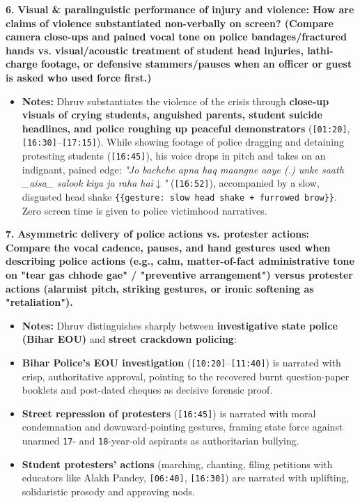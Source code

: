 \documentclass[10pt,a4paper]{article}
\begin{document}
\noindent\textbf{6.} \textbf{Visual \& paralinguistic performance of injury and violence: How are claims of violence substantiated non-verbally on screen? (Compare camera close-ups and pained vocal tone on police bandages/fractured hands vs. visual/acoustic treatment of student head injuries, lathi-charge footage, or defensive stammers/pauses when an officer or guest is asked who used force first.)}\par\smallskip
\begin{itemize}
  \item \textbf{Notes:}
Dhruv substantiates the violence of the crisis through \textbf{close-up visuals of crying students, anguished parents, student suicide headlines, and police roughing up peaceful demonstrators} (\texttt{[01:20]}, \texttt{[16:30]}--\texttt{[17:15]}). While showing footage of police dragging and detaining protesting students (\texttt{[16:45]}), his voice drops in pitch and takes on an indignant, pained edge: \textit{"Jo bachche apna haq maangne aaye (.) unke saath \_aisa\_ salook kiya ja raha hai$\downarrow$"} (\texttt{[16:52]}), accompanied by a slow, disgusted head shake \texttt{\{\{gesture: slow head shake + furrowed brow\}\}}. Zero screen time is given to police victimhood narratives.\par\smallskip
\end{itemize}

\noindent\textbf{7.} \textbf{Asymmetric delivery of police actions vs. protester actions: Compare the vocal cadence, pauses, and hand gestures used when describing police actions (e.g., calm, matter-of-fact administrative tone on "tear gas chhode gae" / "preventive arrangement") versus protester actions (alarmist pitch, striking gestures, or ironic softening as "retaliation").}\par\smallskip
\begin{itemize}
  \item \textbf{Notes:}
Dhruv distinguishes sharply between \textbf{investigative state police (Bihar EOU)} and \textbf{street crackdown policing}:\par\smallskip
  \item \textbf{Bihar Police's EOU investigation} (\texttt{[10:20]}--\texttt{[11:40]}) is narrated with crisp, authoritative approval, pointing to the recovered burnt question-paper booklets and post-dated cheques as decisive forensic proof.
  \item \textbf{Street repression of protesters} (\texttt{[16:45]}) is narrated with moral condemnation and downward-pointing gestures, framing state force against unarmed \texttt{17}- and \texttt{18}-year-old aspirants as authoritarian bullying.
  \item \textbf{Student protesters' actions} (marching, chanting, filing petitions with educators like Alakh Pandey, \texttt{[06:40]}, \texttt{[16:30]}) are narrated with uplifting, solidaristic prosody and approving nods.
\end{itemize}
\end{document}
